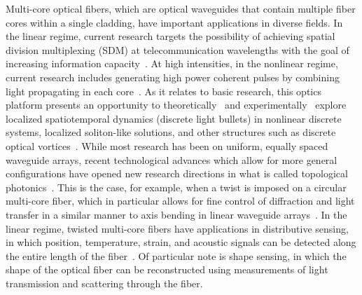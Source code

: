 \documentclass[11pt,reqno]{amsart}
\begin{document}
Multi-core optical fibers, which are optical waveguides that contain multiple fiber cores within a single cladding, have important applications in diverse fields. In the linear regime, current research targets the possibility of achieving spatial division multiplexing (SDM) at telecommunication wavelengths with the goal of increasing information capacity~\cite{azadeh}. At high intensities, in the nonlinear regime, current research includes generating high power coherent pulses by combining light propagating in each core~\cite{balakin}. As it relates to basic research, this optics platform presents an opportunity to  theoretically~\cite{ace} and experimentally~\cite{minardi} explore localized spatiotemporal dynamics (discrete light bullets) in nonlinear discrete systems, localized soliton-like solutions, and  other structures such as discrete optical vortices~\cite{pryamikov}. While most  research has been on uniform, equally spaced waveguide arrays, recent technological advances which allow for more general configurations have opened new research directions in what is called topological photonics~\cite{ozawa}. This is the case, for example, when a twist is imposed on a circular multi-core fiber, which in particular allows for fine control of diffraction and light transfer in a similar manner to axis bending in linear waveguide arrays~\cite{Longhi2005}. In the linear regime, 
twisted multi-core fibers have applications in distributive sensing, in which position, temperature, strain, and acoustic signals can be detected along the entire length of the fiber~\cite{Gannot2014,Westbrook2017}. Of particular note is shape sensing, in which the shape of the optical fiber can be reconstructed using measurements of light transmission and scattering through the fiber.
\end{document}
